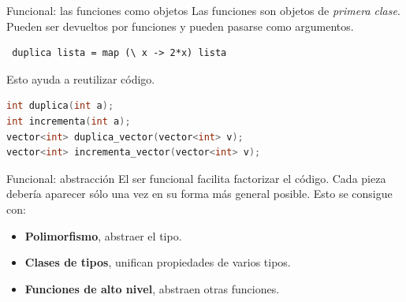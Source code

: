 \begin{frame}[fragile]{Funcional: las funciones como objetos}
 Las funciones son objetos de \textit{primera clase}. Pueden ser devueltos
 por funciones y pueden pasarse como argumentos.

 \begin{lstlisting}
 duplica lista = map (\ x -> 2*x) lista
 \end{lstlisting}

 \espacio
 Esto ayuda a reutilizar código.
 \begin{lstlisting}[language=C++]
int duplica(int a);
int incrementa(int a);
vector<int> duplica_vector(vector<int> v);
vector<int> incrementa_vector(vector<int> v);
 \end{lstlisting}

\end{frame}

\begin{frame}[fragile]{Funcional: abstracción}
  El ser funcional facilita factorizar el código. Cada
  pieza debería aparecer sólo una vez en su forma más
  general posible. Esto se consigue con:

  \begin{itemize}
   \item \textbf{Polimorfismo}, abstraer el tipo.
   \item \textbf{Clases de tipos}, unifican propiedades de varios tipos.
   \item \textbf{Funciones de alto nivel}, abstraen otras funciones.
  \end{itemize}


\end{frame}


